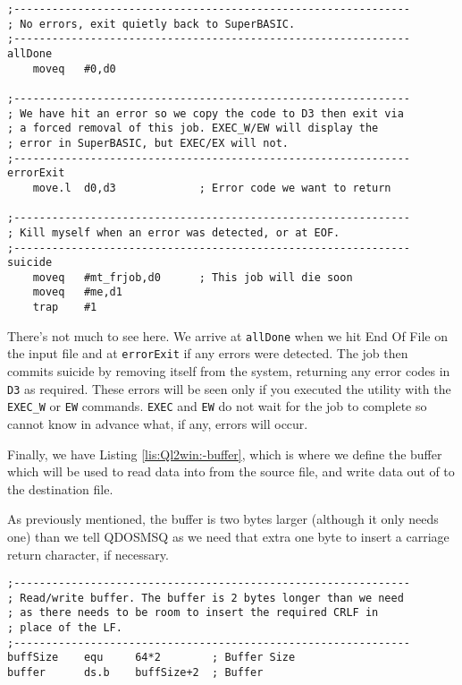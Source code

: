 \begin{lstlisting}[caption={Ql2win: Exit},label={lis:Ql2win:-exit},firstnumber=149]
;--------------------------------------------------------------
; No errors, exit quietly back to SuperBASIC.
;--------------------------------------------------------------
allDone
    moveq   #0,d0

;--------------------------------------------------------------
; We have hit an error so we copy the code to D3 then exit via 
; a forced removal of this job. EXEC_W/EW will display the 
; error in SuperBASIC, but EXEC/EX will not.
;--------------------------------------------------------------
errorExit
    move.l  d0,d3             ; Error code we want to return

;--------------------------------------------------------------
; Kill myself when an error was detected, or at EOF.
;--------------------------------------------------------------
suicide
    moveq   #mt_frjob,d0      ; This job will die soon
    moveq   #me,d1
    trap    #1
\end{lstlisting}

There's not much to see here. We arrive at \lstinline[basicstyle={\ttfamily},showstringspaces=false]!allDone!
when we hit End Of File on the input file and at \lstinline[basicstyle={\ttfamily},showstringspaces=false]!errorExit!
if any errors were detected. The job then commits suicide by removing
itself from the system, returning any error codes in \lstinline[basicstyle={\ttfamily},showstringspaces=false]!D3!
as required. These errors will be seen only if you executed the utility
with the \lstinline[basicstyle={\ttfamily},showstringspaces=false]!EXEC_W!
or \lstinline[basicstyle={\ttfamily},showstringspaces=false]!EW!
commands. \lstinline[basicstyle={\ttfamily},showstringspaces=false]!EXEC!
and \lstinline[basicstyle={\ttfamily},showstringspaces=false]!EW!
do not wait for the job to complete so cannot know in advance what,
if any, errors will occur.

Finally, we have Listing \ref{lis:Ql2win:-buffer}, which is where
we define the buffer which will be used to read data into from the
source file, and write data out of to the destination file.

As previously mentioned, the buffer is two bytes larger (although
it only needs one) than we tell QDOSMSQ as we need that extra one
byte to insert a carriage return character, if necessary.

\begin{lstlisting}[caption={Ql2win: Buffer},label={lis:Ql2win:-buffer},firstnumber=170]
;--------------------------------------------------------------
; Read/write buffer. The buffer is 2 bytes longer than we need
; as there needs to be room to insert the required CRLF in 
; place of the LF.
;--------------------------------------------------------------
buffSize    equ     64*2        ; Buffer Size
buffer      ds.b    buffSize+2  ; Buffer
\end{lstlisting}


